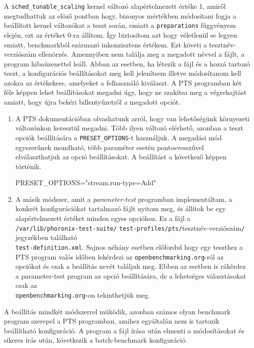 A \texttt{sched\_tunable\_scaling} kernel változó alapértelmezett értéke 1, amiről megtudhattuk az elöző pontban hogy, bizonyos mértékben módosítani fogja a beállított kernel változókat a teszt során, emiatt a \texttt{preparations} függvényem elején, ezt az értéket 0-ra állítom. Így biztosítom azt hogy véletlenül se legyen emiatt, benchmarkból származó inkonzisztens értékem.
Ezt követi a tesztnév-verziószám ellenörzés. Amennyiben nem találja meg a megadott névvel a fájlt, a program hibaüzenettel leáll.
Abban az esetben, ha létezik a fájl és a hozzá tartozó teszt, a konfigurációs beállításokat meg kell jelenítsem illetve módosítanom kell azokra az értékekere, amelyeket a felhasználó kiválaszt.
A PTS programban két féle képpen lehet beállításokat megadni úgy, hogy ne szakítsa meg a végrehajtást amiatt, hogy újra bekéri billentyűzetről a megadott opciót.
\begin{enumerate}
\item A PTS dokumentációban olvashatunk arról, hogy van lehetőségünk környezeti változónkon keresztül megadni. Több ilyen változó elérhető, azonban a teszt opciók beállítására a \texttt{PRESET\_OPTIONS}-t használjuk. A megadási mód egyszerűnek mondható, több paraméter esetén pontosvesszűvel elválaszthatjuk az opció beállításokat. A beállítást a következő képpen történik.
\begin{cpp}
PRESET\_OPTIONS="stream.run-type=Add"
\end{cpp}
\item A másik módszer, amit a \textit{parameter-test} programban implementáltam, a konkrét konfigurációkat tartalmazó fájlt nyitom meg, és állítok be egy alapértelmezett értéket minden egyes opcióhoz. Ez a fájl a \texttt{/var/lib/phoronix-test-suite/} \texttt{test-profiles/pts/}tesztnév-verziószám\texttt{/} jegyzékben található \\ \texttt{test-definition.xml}. Sajnos néhány esetben előfordul hogy egy teszthez a PTS program valós időben lekérdezi az \texttt{openbenchmarking.org}-ról az opciókat és csak a beállítás nevét találjuk meg. Ebben az esetben is rákérdez a parameter-test program az opció beállítására, de a lehetséges választásokat csak az \\ \texttt{openbenchmarking.org}-on tekinthetjük meg.
\end{enumerate}
A beállítás mindkét módszerrel müködik, azonban számos olyan benchmark program szerepel a PTS programban, amihez egyáltalán nem is tartozik beállítható konfiguráció. A program a fájl írása után elmenti a módosításokat és sikeres írás után, következik a batch-benchmark konfiguráció. 
